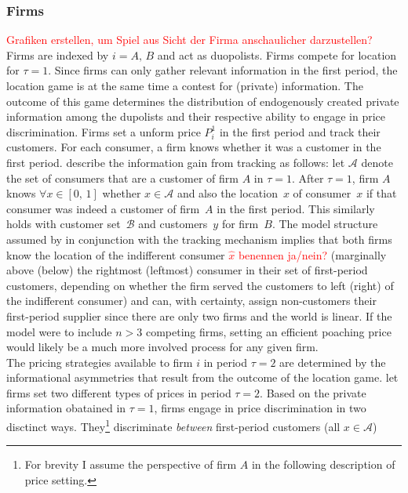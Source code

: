 \documentclass[a4paper, 11 pt, fleqn]{article}
\begin{document}
\subsubsection{Firms}
\textcolor{red}{Grafiken erstellen, um Spiel aus Sicht der Firma anschaulicher darzustellen?}
Firms are indexed by $i = A,\,B$ and act as duopolists. Firms compete for location for $\tau=1$. Since firms can only gather relevant
information in the first period, the location game is at the same time a contest for (private) information. The outcome of this game
determines the distribution of endogenously created private information among the dupolists and their respective ability to engage in
price discrimination. Firms set a unform price $P^1_i$ in the first period and track their customers. For each consumer, a firm knows
whether it was a customer in the first period. \citet[p. 5672]{Choe.2018} describe the information gain from tracking as follows:
let $\mathscr{A}$ denote the set of consumers that are a customer of firm $A$ in $\tau=1$. After $\tau=1$, firm $A$ knows
$\forall x \in [0,\,1]$ whether $x\in \mathscr{A}$ and also the location~$x$ of consumer~$x$ if that consumer was indeed a customer
of firm~$A$ in the first period. This similarly holds with customer set~$\mathscr{B}$ and customers~$y$ for firm~$B$.
The model structure assumed by \citet{Choe.2018} in conjunction with the tracking mechanism
implies that both firms know the location of the indifferent consumer \textcolor{red}{$\hat{x}$ benennen ja/nein?} (marginally above (below) the rightmost (leftmost) consumer in their
set of first-period customers, depending on whether the firm served the customers to left (right) of the indifferent consumer) and can, with
certainty, assign non-customers their first-period supplier since there are only two firms and the world is linear. If the model were to include
$n > 3$ competing firms, setting an efficient poaching price would likely be a much more involved process for any given firm. \\
The pricing strategies available to firm $i$ in period $\tau=2$ are determined by the informational asymmetries that result from the outcome
of the location game. \citet[p. 5672]{Choe.2018} let firms set two different types of prices in period $\tau=2$. Based on the private
information obatained in $\tau=1$, firms engage in price discrimination in two disctinct ways. They\footnote{For brevity I assume the perspective
of firm $A$ in the following description of price setting.} discriminate \textit{between} first-period customers (all $x\in\mathscr{A}$)
\end{document}
